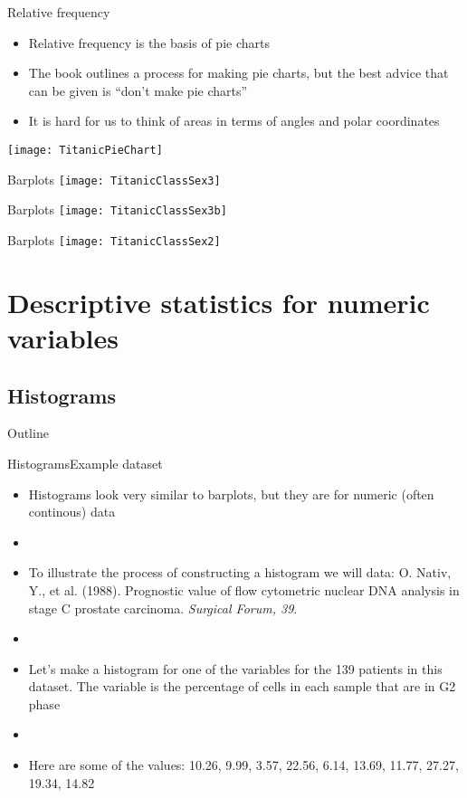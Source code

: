 \documentclass[xcolor=dvipsnames]{beamer}
\begin{document}
\begin{frame}{Relative frequency}
\begin{itemize}
	\item Relative frequency is the basis of pie charts
	\item The book outlines a process for making pie charts, but the best advice that can be given is ``don't make pie charts''
	\item It is hard for us to think of areas in terms of angles and polar coordinates
\end{itemize}
\begin{center}
	\texttt{[image: TitanicPieChart]}
\end{center}
\end{frame}

\begin{frame}{Barplots}
\texttt{[image: TitanicClassSex3]}
\end{frame}

\begin{frame}{Barplots}
\texttt{[image: TitanicClassSex3b]}
\end{frame}

\begin{frame}{Barplots}
\texttt{[image: TitanicClassSex2]}
\end{frame}

\section{Descriptive statistics for numeric variables}
\subsection{Histograms}
\begin{frame}{Outline}
\tableofcontents[currentsection,subsectionstyle=show/shaded/hide]
\end{frame}

\begin{frame}{Histograms}{Example dataset}
\begin{itemize}
	\item Histograms look very similar to barplots, but they are for numeric (often continous) data
	\item[]
	\item To illustrate the process of constructing a histogram we will data: O. Nativ, Y., et al. (1988). Prognostic value of flow cytometric nuclear DNA analysis in stage C prostate carcinoma. \emph{Surgical Forum, 39}.
	\item[]
	\item Let's make a histogram for one of the variables for the 139 patients in this dataset. The variable is the percentage of cells in each sample that are in G2 phase
	\item[]
	\item Here are some of the values: 10.26, 9.99, 3.57, 22.56, 6.14, 13.69, 11.77, 27.27, 19.34, 14.82 
\end{itemize}
\end{frame}
\end{document}
